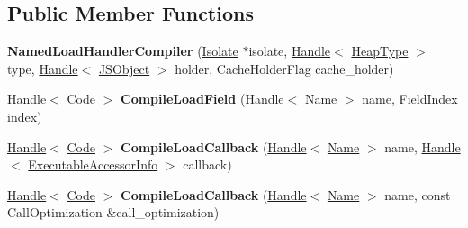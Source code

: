 \subsection*{Public Member Functions}
\begin{DoxyCompactItemize}
\item 
\hypertarget{classv8_1_1internal_1_1_named_load_handler_compiler_a5f64b17fc6c5f7524e095f749e592a3b}{}{\bfseries Named\+Load\+Handler\+Compiler} (\hyperlink{classv8_1_1internal_1_1_isolate}{Isolate} $\ast$isolate, \hyperlink{classv8_1_1internal_1_1_handle}{Handle}$<$ \hyperlink{classv8_1_1internal_1_1_type_impl}{Heap\+Type} $>$ type, \hyperlink{classv8_1_1internal_1_1_handle}{Handle}$<$ \hyperlink{classv8_1_1internal_1_1_j_s_object}{J\+S\+Object} $>$ holder, Cache\+Holder\+Flag cache\+\_\+holder)\label{classv8_1_1internal_1_1_named_load_handler_compiler_a5f64b17fc6c5f7524e095f749e592a3b}

\item 
\hypertarget{classv8_1_1internal_1_1_named_load_handler_compiler_a39d6289bb9e55f86cf8d642a022bae13}{}\hyperlink{classv8_1_1internal_1_1_handle}{Handle}$<$ \hyperlink{classv8_1_1internal_1_1_code}{Code} $>$ {\bfseries Compile\+Load\+Field} (\hyperlink{classv8_1_1internal_1_1_handle}{Handle}$<$ \hyperlink{classv8_1_1internal_1_1_name}{Name} $>$ name, Field\+Index index)\label{classv8_1_1internal_1_1_named_load_handler_compiler_a39d6289bb9e55f86cf8d642a022bae13}

\item 
\hypertarget{classv8_1_1internal_1_1_named_load_handler_compiler_a193d14cc3ed058aa9a67d8cc2b65b04e}{}\hyperlink{classv8_1_1internal_1_1_handle}{Handle}$<$ \hyperlink{classv8_1_1internal_1_1_code}{Code} $>$ {\bfseries Compile\+Load\+Callback} (\hyperlink{classv8_1_1internal_1_1_handle}{Handle}$<$ \hyperlink{classv8_1_1internal_1_1_name}{Name} $>$ name, \hyperlink{classv8_1_1internal_1_1_handle}{Handle}$<$ \hyperlink{classv8_1_1internal_1_1_executable_accessor_info}{Executable\+Accessor\+Info} $>$ callback)\label{classv8_1_1internal_1_1_named_load_handler_compiler_a193d14cc3ed058aa9a67d8cc2b65b04e}

\item 
\hypertarget{classv8_1_1internal_1_1_named_load_handler_compiler_aa62431f8bd3de494d6789460d8ddadbf}{}\hyperlink{classv8_1_1internal_1_1_handle}{Handle}$<$ \hyperlink{classv8_1_1internal_1_1_code}{Code} $>$ {\bfseries Compile\+Load\+Callback} (\hyperlink{classv8_1_1internal_1_1_handle}{Handle}$<$ \hyperlink{classv8_1_1internal_1_1_name}{Name} $>$ name, const Call\+Optimization \&call\+\_\+optimization)\label{classv8_1_1internal_1_1_named_load_handler_compiler_aa62431f8bd3de494d6789460d8ddadbf}


\end{DoxyCompactItemize}

